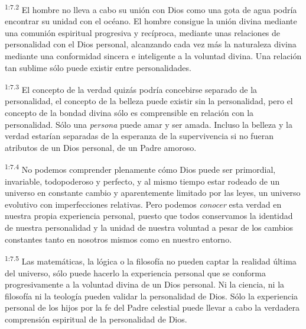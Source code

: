 \par
\textsuperscript{1:7.2} El hombre no lleva a cabo su unión con Dios como una gota de agua podría encontrar su unidad con el océano. El hombre consigue la unión divina mediante una comunión espiritual progresiva y recíproca, mediante unas relaciones de personalidad con el Dios personal, alcanzando cada vez más la naturaleza divina mediante una conformidad sincera e inteligente a la voluntad divina. Una relación tan sublime sólo puede existir entre personalidades.

\par
\textsuperscript{1:7.3} El concepto de la verdad quizás podría concebirse separado de la personalidad, el concepto de la belleza puede existir sin la personalidad, pero el concepto de la bondad divina sólo es comprensible en relación con la personalidad. Sólo una \textit{persona} puede amar y ser amada. Incluso la belleza y la verdad estarían separadas de la esperanza de la supervivencia si no fueran atributos de un Dios personal, de un Padre amoroso.

\par
\textsuperscript{1:7.4} No podemos comprender plenamente cómo Dios puede ser primordial, invariable, todopoderoso y perfecto, y al mismo tiempo estar rodeado de un universo en constante cambio y aparentemente limitado por las leyes, un universo evolutivo con imperfecciones relativas. Pero podemos \textit{conocer} esta verdad en nuestra propia experiencia personal, puesto que todos conservamos la identidad de nuestra personalidad y la unidad de nuestra voluntad a pesar de los cambios constantes tanto en nosotros mismos como en nuestro entorno.

\par
\textsuperscript{1:7.5} Las matemáticas, la lógica o la filosofía no pueden captar la realidad última del universo, sólo puede hacerlo la experiencia personal que se conforma progresivamente a la voluntad divina de un Dios personal. Ni la ciencia, ni la filosofía ni la teología pueden validar la personalidad de Dios. Sólo la experiencia personal de los hijos por la fe del Padre celestial puede llevar a cabo la verdadera comprensión espiritual de la personalidad de Dios.

